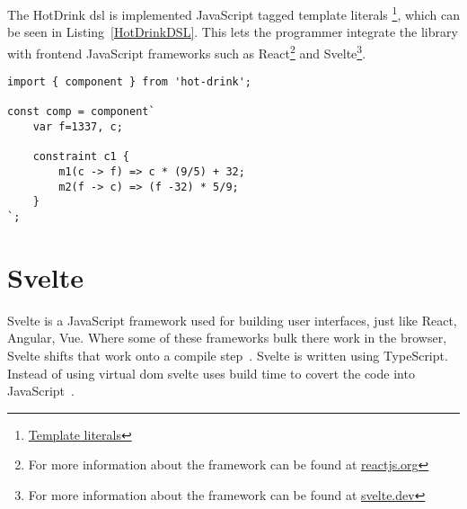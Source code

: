 The HotDrink \gls{dsl} is implemented JavaScript tagged template literals
\footnote{\href{https://developer.mozilla.org/en-US/docs/Web/JavaScript/Reference/Template_literals}{Template literals}}, 
which can be seen in Listing~\ref{HotDrinkDSL}. This lets the programmer integrate the 
library with frontend JavaScript frameworks such as 
React\footnote{For more information about the framework can be found at \href{https://reactjs.org/}{reactjs.org}} and 
Svelte\footnote{For more information about the framework can be found at \href{https://svelte.dev/}{svelte.dev}}. 



\begin{lstlisting}[caption={Example of the HotDrink \gls{dsl}},label=HotDrinkDSL, language=hotdrink]
import { component } from 'hot-drink';

const comp = component`
    var f=1337, c;

    constraint c1 {
        m1(c -> f) => c * (9/5) + 32;
        m2(f -> c) => (f -32) * 5/9;
    }
`;
\end{lstlisting}

\section{Svelte}
Svelte is a JavaScript framework used for building user interfaces, just like React, 
Angular, Vue. Where some of these frameworks bulk there work in the browser, Svelte 
shifts that work onto a compile step~\cite{sveltewebsite}. Svelte is written using 
TypeScript. Instead of using virtual \gls{dom} svelte uses build time to covert the 
code into JavaScript~\cite{sveltedocs}.